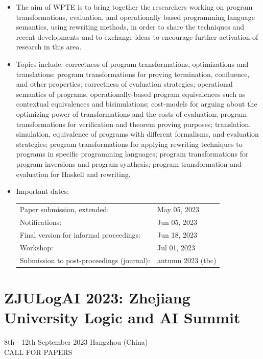 \documentclass[prodmode,acmtecs]{acmsmall} %
\begin{document}
\begin{itemize}\item  The aim of WPTE is to bring together the researchers working on program transformations, evaluation, and operationally based programming language semantics, using rewriting methods, in order to share the techniques and recent developments and to exchange ideas to encourage further activation of research in this area. 
 
\item  Topics include: correctness of program transformations, optimizations and translations; program transformations for proving termination, confluence, and other properties; correctness of evaluation strategies; operational semantics of programs, operationally-based program equivalences such as contextual equivalences and bisimulations; cost-models for arguing about the optimizing power of transformations and the costs of evaluation; program transformations for verification and theorem proving purposes; translation, simulation, equivalence of programs with different formalisms, and evaluation strategies; program transformations for applying rewriting techniques to programs in specific programming languages; program transformations for program inversions and program synthesis; program transformation and evaluation for Haskell and rewriting. 
 
\item  Important dates: 
 
\begin{tabulary}{\linewidth}{LL}Paper submission, extended:  & May 05, 2023 \\
Notifications:  & Jun 05, 2023 \\
Final version for informal proceedings:  & Jun 18, 2023 \\
Workshop:  & Jul 01, 2023 \\
Submission to post-proceedings (journal):  & autumn 2023 (tbc) \\
\end{tabulary}
 
\end{itemize}\section{ZJULogAI 2023: Zhejiang University Logic and AI Summit}\label{ZJULogAI2023}  8th - 12th September 2023 Hangzhou (China)\\ 
CALL FOR PAPERS 
\end{document}
